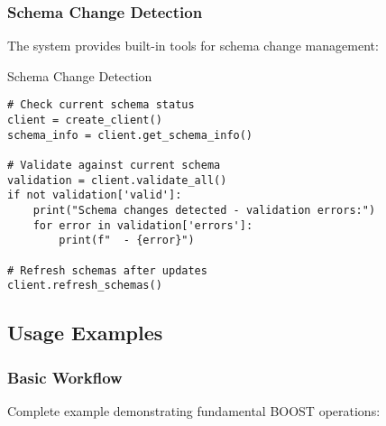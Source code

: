 \subsubsection{Schema Change Detection}
\label{sec:python-change-detection}

The system provides built-in tools for schema change management:

\begin{pythonexample}{Schema Change Detection}
\begin{verbatim}
# Check current schema status
client = create_client()
schema_info = client.get_schema_info()

# Validate against current schema
validation = client.validate_all()
if not validation['valid']:
    print("Schema changes detected - validation errors:")
    for error in validation['errors']:
        print(f"  - {error}")

# Refresh schemas after updates
client.refresh_schemas()
\end{verbatim}
\end{pythonexample}

\subsection{Usage Examples}
\label{sec:python-examples}

\subsubsection{Basic Workflow}
\label{sec:python-basic-workflow}

Complete example demonstrating fundamental BOOST operations:


